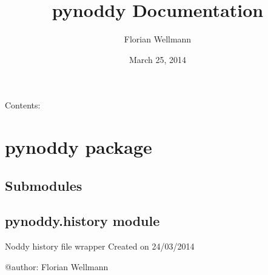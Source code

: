 \documentclass[letterpaper,10pt,english]{sphinxmanual}
\title{pynoddy Documentation}
\date{March 25, 2014}
\author{Florian Wellmann}
\begin{document}
\maketitle
\tableofcontents
{}\label{index::doc}


Contents:


\chapter{pynoddy package}
\label{pynoddy:pynoddy-package}\label{pynoddy:welcome-to-pynoddy-s-documentation}\label{pynoddy::doc}

\section{Submodules}
\label{pynoddy:submodules}

\section{pynoddy.history module}
\label{pynoddy:pynoddy-history-module}\label{pynoddy:module-pynoddy.history}
Noddy history file wrapper
Created on 24/03/2014

@author: Florian Wellmann
\end{document}
